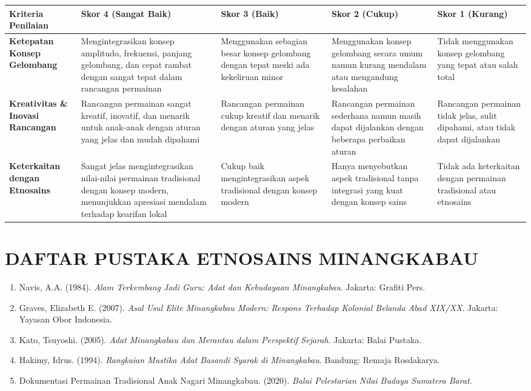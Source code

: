 \documentclass[12pt,a4paper]{article}
\begin{document}
\begin{longtable}{|p{3cm}|p{3cm}|p{3cm}|p{3cm}|p{3cm}|}
\hline
\textbf{Kriteria Penilaian} & \textbf{Skor 4 (Sangat Baik)} & \textbf{Skor 3 (Baik)} & \textbf{Skor 2 (Cukup)} & \textbf{Skor 1 (Kurang)} \\
\hline
\textbf{Ketepatan Konsep Gelombang} & Mengintegrasikan konsep amplitudo, frekuensi, panjang gelombang, dan cepat rambat dengan sangat tepat dalam rancangan permainan & Menggunakan sebagian besar konsep gelombang dengan tepat meski ada kekeliruan minor & Menggunakan konsep gelombang secara umum namun kurang mendalam atau mengandung kesalahan & Tidak menggunakan konsep gelombang yang tepat atau salah total \\
\hline
\textbf{Kreativitas \& Inovasi Rancangan} & Rancangan permainan sangat kreatif, inovatif, dan menarik untuk anak-anak dengan aturan yang jelas dan mudah dipahami & Rancangan permainan cukup kreatif dan menarik dengan aturan yang jelas & Rancangan permainan sederhana namun masih dapat dijalankan dengan beberapa perbaikan aturan & Rancangan permainan tidak jelas, sulit dipahami, atau tidak dapat dijalankan \\
\hline
\textbf{Keterkaitan dengan Etnosains} & Sangat jelas mengintegrasikan nilai-nilai permainan tradisional dengan konsep modern, menunjukkan apresiasi mendalam terhadap kearifan lokal & Cukup baik mengintegrasikan aspek tradisional dengan konsep modern & Hanya menyebutkan aspek tradisional tanpa integrasi yang kuat dengan konsep sains & Tidak ada keterkaitan dengan permainan tradisional atau etnosains \\
\hline
\end{longtable}

\section{DAFTAR PUSTAKA ETNOSAINS MINANGKABAU}

\begin{enumerate}
\item Navis, A.A. (1984). \textit{Alam Terkembang Jadi Guru: Adat dan Kebudayaan Minangkabau}. Jakarta: Grafiti Pers.
\item Graves, Elizabeth E. (2007). \textit{Asal Usul Elite Minangkabau Modern: Respons Terhadap Kolonial Belanda Abad XIX/XX}. Jakarta: Yayasan Obor Indonesia.
\item Kato, Tsuyoshi. (2005). \textit{Adat Minangkabau dan Merantau dalam Perspektif Sejarah}. Jakarta: Balai Pustaka.
\item Hakimy, Idrus. (1994). \textit{Rangkaian Mustika Adat Basandi Syarak di Minangkabau}. Bandung: Remaja Rosdakarya.
\item Dokumentasi Permainan Tradisional Anak Nagari Minangkabau. (2020). \textit{Balai Pelestarian Nilai Budaya Sumatera Barat}.
\end{enumerate}
\end{document}
